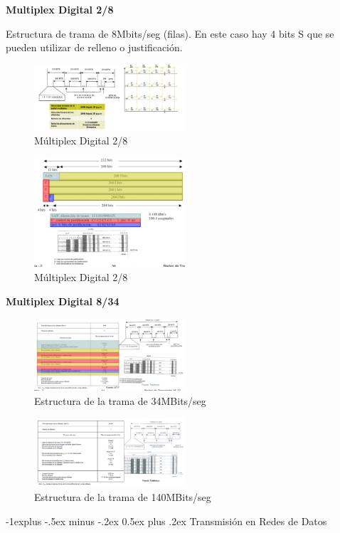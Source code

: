 \documentclass[10pt,portrait, twocolumn]{article}
\makeatletter
\renewcommand{\subsection}{\@startsection{subsection}{2}{0mm}%
                                {-1explus -.5ex minus -.2ex}%
                                {0.5ex plus .2ex}%
                                {\normalfont\normalsize\bfseries}}
\makeatother
\begin{document}
\textbf{Multiplex Digital 2/8}

Estructura de trama de 8Mbits/seg (filas). En este caso hay 4 bits S que se pueden utilizar de relleno o justificación.

\begin{figure}[!ht]
	\centering
     \includegraphics[width=0.5\textwidth]{mux28}
      \caption{Múltiplex Digital 2/8}
      \label{fig:Regiones de frecuencias}
\end{figure}

\begin{figure}[!ht]
	\centering
     \includegraphics[width=0.5\textwidth]{otromux}
      \caption{Múltiplex Digital 2/8}
      \label{fig:Regiones de frecuencias}
\end{figure}

\textbf{Multiplex Digital 8/34}

\begin{figure}[!ht]
	\centering
     \includegraphics[width=0.5\textwidth]{mux834}
      \caption{Estructura de la trama de 34MBits/seg}
      \label{fig:Regiones de frecuencias}
\end{figure}


\begin{figure}[!ht]
	\centering
     \includegraphics[width=0.5\textwidth]{trama140}
      \caption{Estructura de la trama de 140MBits/seg}
      \label{fig:Regiones de frecuencias}
\end{figure}


\subsection{Transmisión en Redes de Datos}


	
	




\end{document}
